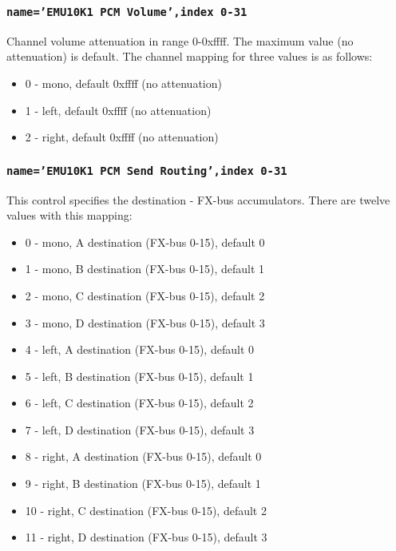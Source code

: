 \documentclass[a4paper,8pt,english]{sphinxmanual}
\begin{document}
\subsubsection{\texttt{name='EMU10K1 PCM Volume',index 0-31}}
\label{sound/cards/sb-live-mixer:name-emu10k1-pcm-volume-index-0-31}
Channel volume attenuation in range 0-0xffff. The maximum value (no
attenuation) is default. The channel mapping for three values is
as follows:
\begin{itemize}
\item {} 
0 - mono, default 0xffff (no attenuation)

\item {} 
1 - left, default 0xffff (no attenuation)

\item {} 
2 - right, default 0xffff (no attenuation)

\end{itemize}


\subsubsection{\texttt{name='EMU10K1 PCM Send Routing',index 0-31}}
\label{sound/cards/sb-live-mixer:name-emu10k1-pcm-send-routing-index-0-31}
This control specifies the destination - FX-bus accumulators. There are
twelve values with this mapping:
\begin{itemize}
\item {} 
0 -  mono, A destination (FX-bus 0-15), default 0

\item {} 
1 -  mono, B destination (FX-bus 0-15), default 1

\item {} 
2 -  mono, C destination (FX-bus 0-15), default 2

\item {} 
3 -  mono, D destination (FX-bus 0-15), default 3

\item {} 
4 -  left, A destination (FX-bus 0-15), default 0

\item {} 
5 -  left, B destination (FX-bus 0-15), default 1

\item {} 
6 -  left, C destination (FX-bus 0-15), default 2

\item {} 
7 -  left, D destination (FX-bus 0-15), default 3

\item {} 
8 - right, A destination (FX-bus 0-15), default 0

\item {} 
9 - right, B destination (FX-bus 0-15), default 1

\item {} 
10 - right, C destination (FX-bus 0-15), default 2

\item {} 
11 - right, D destination (FX-bus 0-15), default 3

\end{itemize}
\end{document}
